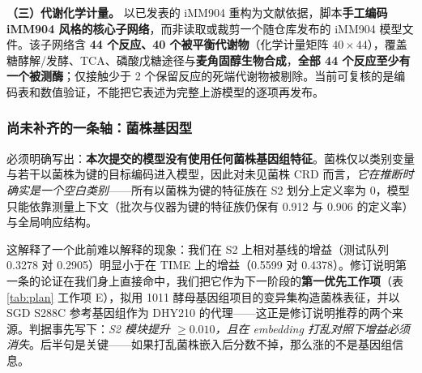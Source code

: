 \textbf{（三）代谢化学计量。} 以已发表的 iMM904 重构\citep{mo2009imm904}为文献依据，脚本\textbf{手工编码 iMM904 风格的核心子网络}，而非读取或裁剪一个随仓库发布的 iMM904 模型文件。该子网络含 \textbf{44 个反应、40 个被平衡代谢物}（化学计量矩阵 $40\times44$），覆盖糖酵解/发酵、TCA、磷酸戊糖途径与\textbf{麦角固醇生物合成}，\textbf{全部 44 个反应至少有一个被测酶}\citep{orth2010fba,heirendt2019cobra}；仅接触少于 2 个保留反应的死端代谢物被剔除。当前可复核的是编码表和数值验证，不能把它表述为完整上游模型的逐项再发布。

\subsubsection{\NEW{}尚未补齐的一条轴：菌株基因型}

必须明确写出：\textbf{本次提交的模型没有使用任何菌株基因组特征}。菌株仅以类别变量与若干以菌株为键的目标编码进入模型，因此对未见菌株 CRD 而言，\emph{它在推断时确实是一个空白类别}——所有以菌株为键的特征族在 S2 划分上定义率为 0，模型只能依靠测量上下文（批次与仪器为键的特征族仍保有 0.912 与 0.906 的定义率）与全局响应结构。

这解释了一个此前难以解释的现象：我们在 S2 上相对基线的增益（测试队列 0.3278 对 0.2905）明显小于在 TIME 上的增益（0.5599 对 0.4378）。修订说明第一条的论证在我们身上直接命中，我们把它作为下一阶段的\textbf{第一优先工作项}（表 \ref{tab:plan} 工作项 E），拟用 1011 酵母基因组项目\citep{peter2018_1011genomes}的变异集构造菌株表征，并以 SGD S288C 参考基因组\citep{engel2022sgd}作为 DHY210 的代理——这正是修订说明推荐的两个来源。判据事先写下：\emph{S2 模块提升 $\ge0.010$，且在 embedding 打乱对照下增益必须消失}。后半句是关键——如果打乱菌株嵌入后分数不掉，那么涨的不是基因组信息。


